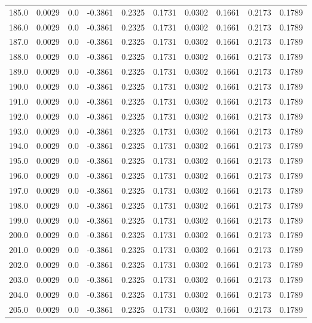 \begin{longtable}{lrrrrrrrrr}
185.0 & 0.0029 & 0.0 & -0.3861 & 0.2325 & 0.1731 & 0.0302 & 0.1661 & 0.2173 & 0.1789 \\
186.0 & 0.0029 & 0.0 & -0.3861 & 0.2325 & 0.1731 & 0.0302 & 0.1661 & 0.2173 & 0.1789 \\
187.0 & 0.0029 & 0.0 & -0.3861 & 0.2325 & 0.1731 & 0.0302 & 0.1661 & 0.2173 & 0.1789 \\
188.0 & 0.0029 & 0.0 & -0.3861 & 0.2325 & 0.1731 & 0.0302 & 0.1661 & 0.2173 & 0.1789 \\
189.0 & 0.0029 & 0.0 & -0.3861 & 0.2325 & 0.1731 & 0.0302 & 0.1661 & 0.2173 & 0.1789 \\
190.0 & 0.0029 & 0.0 & -0.3861 & 0.2325 & 0.1731 & 0.0302 & 0.1661 & 0.2173 & 0.1789 \\
191.0 & 0.0029 & 0.0 & -0.3861 & 0.2325 & 0.1731 & 0.0302 & 0.1661 & 0.2173 & 0.1789 \\
192.0 & 0.0029 & 0.0 & -0.3861 & 0.2325 & 0.1731 & 0.0302 & 0.1661 & 0.2173 & 0.1789 \\
193.0 & 0.0029 & 0.0 & -0.3861 & 0.2325 & 0.1731 & 0.0302 & 0.1661 & 0.2173 & 0.1789 \\
194.0 & 0.0029 & 0.0 & -0.3861 & 0.2325 & 0.1731 & 0.0302 & 0.1661 & 0.2173 & 0.1789 \\
195.0 & 0.0029 & 0.0 & -0.3861 & 0.2325 & 0.1731 & 0.0302 & 0.1661 & 0.2173 & 0.1789 \\
196.0 & 0.0029 & 0.0 & -0.3861 & 0.2325 & 0.1731 & 0.0302 & 0.1661 & 0.2173 & 0.1789 \\
197.0 & 0.0029 & 0.0 & -0.3861 & 0.2325 & 0.1731 & 0.0302 & 0.1661 & 0.2173 & 0.1789 \\
198.0 & 0.0029 & 0.0 & -0.3861 & 0.2325 & 0.1731 & 0.0302 & 0.1661 & 0.2173 & 0.1789 \\
199.0 & 0.0029 & 0.0 & -0.3861 & 0.2325 & 0.1731 & 0.0302 & 0.1661 & 0.2173 & 0.1789 \\
200.0 & 0.0029 & 0.0 & -0.3861 & 0.2325 & 0.1731 & 0.0302 & 0.1661 & 0.2173 & 0.1789 \\
201.0 & 0.0029 & 0.0 & -0.3861 & 0.2325 & 0.1731 & 0.0302 & 0.1661 & 0.2173 & 0.1789 \\
202.0 & 0.0029 & 0.0 & -0.3861 & 0.2325 & 0.1731 & 0.0302 & 0.1661 & 0.2173 & 0.1789 \\
203.0 & 0.0029 & 0.0 & -0.3861 & 0.2325 & 0.1731 & 0.0302 & 0.1661 & 0.2173 & 0.1789 \\
204.0 & 0.0029 & 0.0 & -0.3861 & 0.2325 & 0.1731 & 0.0302 & 0.1661 & 0.2173 & 0.1789 \\
205.0 & 0.0029 & 0.0 & -0.3861 & 0.2325 & 0.1731 & 0.0302 & 0.1661 & 0.2173 & 0.1789 \\

\end{longtable}
